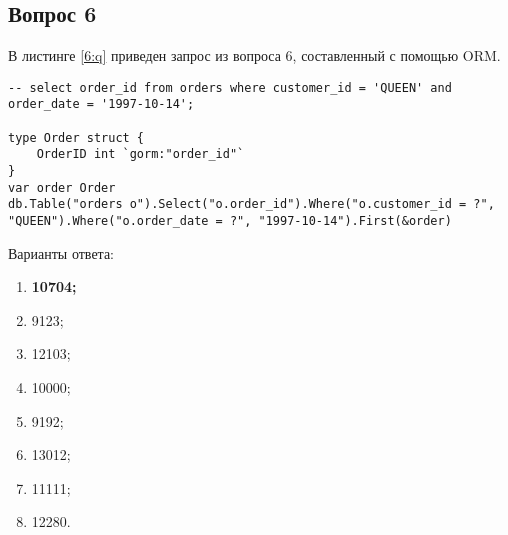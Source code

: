 \begin{appendices}
%
%
%
%
%

\section{Вопрос 6}

В листинге \ref{6:q} приведен запрос из вопроса 6, составленный с помощью ORM.

\begin{lstlisting}[label=6:q,caption=Вопрос 6]
-- select order_id from orders where customer_id = 'QUEEN' and order_date = '1997-10-14';

type Order struct {
	OrderID int `gorm:"order_id"`
}
var order Order
db.Table("orders o").Select("o.order_id").Where("o.customer_id = ?", "QUEEN").Where("o.order_date = ?", "1997-10-14").First(&order)

\end{lstlisting}

Варианты ответа:

\begin{enumerate}
	\item \textbf{10704;}
	\item 9123;
	\item 12103;
	\item 10000;
	\item 9192;
	\item 13012;
	\item 11111;
	\item 12280.
\end{enumerate}


\end{appendices}
